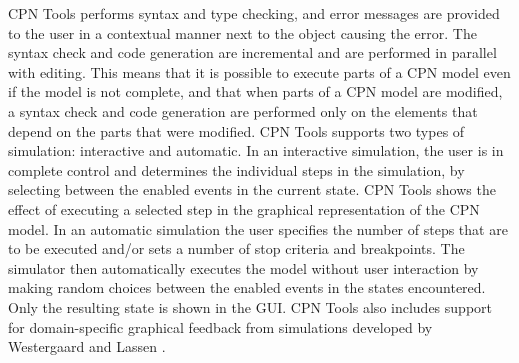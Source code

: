 CPN Tools performs syntax and type checking, and error messages are
provided to the user in a contextual manner next to the object causing
the error. The syntax check and code generation are incremental and
are performed in parallel with editing. This means that it is possible
to execute parts of a CPN model even if the model is not complete, and
that when parts of a CPN model are modified, a syntax check and code
generation are performed only on the elements that depend on the parts
that were modified. CPN Tools supports two types of simulation:
interactive and automatic. In an interactive simulation, the user is
in complete control and determines the individual steps in the
simulation, by selecting between the enabled events in the current
state. CPN Tools shows the effect of executing a selected step in the
graphical representation of the CPN model. In an automatic simulation
the user specifies the number of steps that are to be executed and/or
sets a number of stop criteria and breakpoints. The simulator then
automatically executes the model without user interaction by making
random choices between the enabled events in the states
encountered. Only the resulting state is shown in the GUI. CPN Tools
also includes support for domain-specific graphical feedback from
simulations developed by Westergaard and Lassen \cite{britney}.






